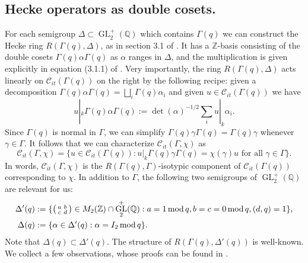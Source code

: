 \documentclass{article}
\theoremstyle{named}
\newcommand{\C}{\mathcal{C}}
\newcommand{\Z}{\mathbb{Z}}
\newcommand{\Q}{\mathbb{Q}}
\DeclareMathOperator{\GL}{GL}
\DeclareMathOperator{\modulo}{mod}
\begin{document}
\subsection{Hecke operators as double cosets.}\label{subsec:heckeasdoublecoset}
For each semigroup $\Delta \subset \GL_2^+(\Q)$ which contains $\Gamma(q)$ we can construct the Hecke ring $R(\Gamma(q), \Delta)$, as in section 3.1 of \cite{shimurabook}. It has a $\Z$-basis consisting of the double cosets $\Gamma(q)\alpha\Gamma(q)$ as $\alpha$ ranges in $\Delta$, and the multiplication is given explicitly in equation (3.1.1) of \cite{shimurabook}. Very importantly, the ring $R(\Gamma(q), \Delta)$ acts linearly on $\C_{it}(\Gamma(q))$ on the right by the following recipe: given a decomposition $\Gamma(q)\alpha\Gamma(q) = \bigsqcup_{i} \Gamma(q)\alpha_i$ and given $u \in \C_{it}(\Gamma(q))$ we have  
\begin{equation}\label{eq:slashoperatordoublecosets}
    u |_k \Gamma(q)\alpha\Gamma(q) := \det(\alpha)^{-1/2}\sum_i u|_k \alpha_i.
\end{equation}
Since $\Gamma(q)$ is normal in $\Gamma$, we can simplify $\Gamma(q)\gamma \Gamma(q) = \Gamma(q)\gamma$ whenever $\gamma \in \Gamma$. It follows that we can characterize $\C_{it}(\Gamma, \chi)$ as
\begin{equation}\label{eq:formsasisotopycspace}
    \C_{it}(\Gamma, \chi) = \{u \in \C_{it}(\Gamma(q)): u|_k \Gamma(q) \gamma\Gamma(q) = \chi(\gamma)u \text{ for all }\gamma \in \Gamma\}.
\end{equation}
In words, $\C_{it}(\Gamma, \chi)$ is the $R(\Gamma(q), \Gamma)$-isotypic component of $\C_{it}(\Gamma(q))$ corresponding to $\chi$. In addition to $\Gamma$, the following two semigroups of $\GL_2^+(\Q)$ are relevant for us:
\begin{equation}\label{eq:defiofsemigroups}
\begin{aligned}
    \Delta'(q) & := \{\begin{psmallmatrix}
        a & b\\
        c & d
    \end{psmallmatrix} \in M_2(\Z) \cap \GL_2^+(\Q) : a = 1 \modulo q, b =  c = 0 \modulo q, (d, q) = 1\},\\
    \Delta(q) & := \{\alpha \in \Delta'(q) : \alpha = I_2 \modulo q\}.
\end{aligned}
\end{equation}
Note that $\Delta(q) \subset \Delta'(q)$. The structure of $R(\Gamma(q), \Delta'(q))$ is well-known. We collect a few observations, whose proofs can be found in \cite[Sections 3.3 and 3.5]{shimurabook}.
\end{document}
